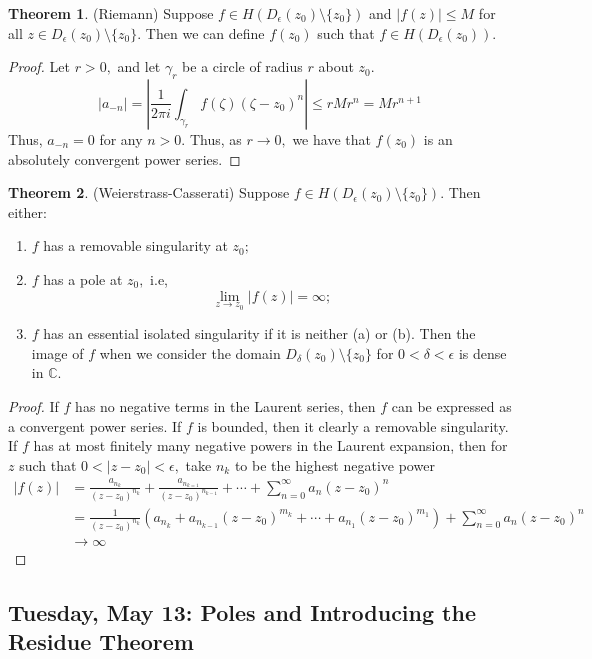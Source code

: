 \documentclass[10pt, oneside]{article}
\newcommand{\bbC}{\mathbb{C}}
\newcommand{\sm}{\setminus}
\theoremstyle{definition}
\newtheorem{thm}{Theorem}
\newcommand{\bbC}{\mathbb{C}}
\newcommand{\sm}{\setminus}
\begin{document}
\begin{thm}
    (Riemann) Suppose $f \in H(D_{\epsilon}(z_0) \sm \{z_0\})$ and $|f(z)| \leq M$ for all $z \in D_{\epsilon}(z_0) \sm \{z_0\}.$ Then we can define $f(z_0)$ such that $f \in H(D_\epsilon(z_0)).$
\end{thm}
\begin{proof}
    Let $r>0,$ and let $\gamma_r$ be a circle of radius $r$ about $z_0.$ 
    \[|a_{-n}| = \left|\frac{1}{2\pi i}\int_{\gamma_r} f(\zeta)(\zeta - z_0)^n\right| \leq r M r ^n = Mr^{n+1}\] Thus, $a_{-n} = 0$ for any $n >0.$ Thus, as $r \to 0,$ we have that $f(z_0)$ is an absolutely convergent power series.
\end{proof}

\begin{thm}
    (Weierstrass-Casserati) Suppose $f\in H(D_\epsilon(z_0)\sm \{z_0\}).$ Then either:
    \begin{enumerate}
        \item $f$ has a removable singularity at $z_0;$
        \item $f$ has a pole at $z_0,$ i.e, 
        \[\lim_{z\to z_0}|f(z)| = \infty;\]
        \item $f$ has an essential isolated singularity if it is neither (a) or (b). Then the image of $f$ when we consider the domain $D_\delta(z_0) \sm \{z_0\}$ for $0 < \delta < \epsilon$ is dense in $\bbC.$
    \end{enumerate}
\end{thm}

\begin{proof}
    If $f$ has no negative terms in the Laurent series, then $f$ can be expressed as a convergent power series. If $f$ is bounded, then it clearly a removable singularity. If $f$ has at most finitely many negative powers in the Laurent expansion, then for $z$ such that $0 < |z - z_0| < \epsilon,$ take $n_k$ to be the highest negative power
    \begin{align*}
    |f(z)| &= \frac{a_{n_k}}{(z - z_0)^{n_k}} + \frac{a_{n_{k=1}}}{(z - z_0)^{n_{k-1}}} + \cdots+ \sum_{n=0}^\infty a_n (z - z_0)^n\\ &=  \frac{1}{(z - z_0)^{n_k}}\left(a_{n_k}+ a_{n_{k-1}}(z - z_0)^{m_k} + \cdots + a_{n_1}(z - z_0)^{m_1} \right) + \sum_{n=0}^\infty a_n (z - z_0)^n \\
    &\to \infty
    \end{align*}
\end{proof}

\newpage
\subsection{Tuesday, May 13: Poles and Introducing the Residue Theorem}
\end{document}
